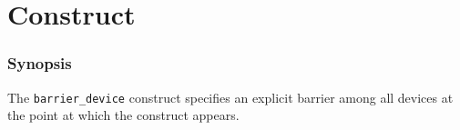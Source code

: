 \section{ Construct}

\subsubsection*{Synopsis}

The {\tt barrier\_device} construct specifies an explicit barrier among
all devices at the point at which the construct appears.
